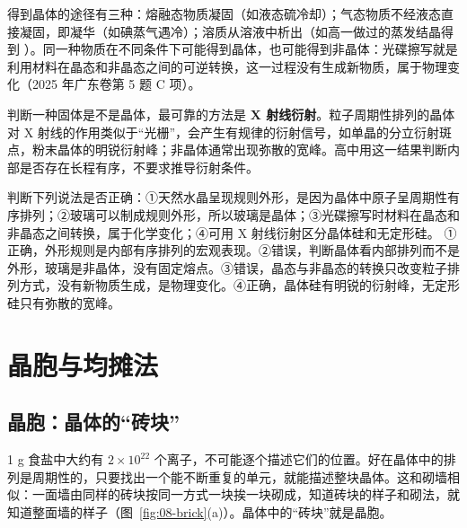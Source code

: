 得到晶体的途径有三种：熔融态物质凝固（如液态硫冷却）；气态物质不经液态直接凝固，即凝华（如碘蒸气遇冷）；溶质从溶液中析出（如高一做过的蒸发结晶得到 ）。同一种物质在不同条件下可能得到晶体，也可能得到非晶体：光碟擦写就是利用材料在晶态和非晶态之间的可逆转换，这一过程没有生成新物质，属于物理变化（2025 年广东卷第 5 题 C 项）。

判断一种固体是不是晶体，最可靠的方法是 \textbf{X 射线衍射}。粒子周期性排列的晶体对 X 射线的作用类似于“光栅”，会产生有规律的衍射信号，如单晶的分立衍射斑点，粉末晶体的明锐衍射峰；非晶体通常出现弥散的宽峰。高中用这一结果判断内部是否存在长程有序，不要求推导衍射条件。

\begin{liti}[晶态与非晶态的基础判断]
判断下列说法是否正确：①天然水晶呈现规则外形，是因为晶体中原子呈周期性有序排列；②玻璃可以制成规则外形，所以玻璃是晶体；③光碟擦写时材料在晶态和非晶态之间转换，属于化学变化；④可用 X 射线衍射区分晶体硅和无定形硅。
\tcblower
\jie ①正确，外形规则是内部有序排列的宏观表现。②错误，判断晶体看内部排列而不是外形，玻璃是非晶体，没有固定熔点。③错误，晶态与非晶态的转换只改变粒子排列方式，没有新物质生成，是物理变化。④正确，晶体硅有明锐的衍射峰，无定形硅只有弥散的宽峰。
\end{liti}

\section{晶胞与均摊法}

\subsection{晶胞：晶体的“砖块”}

1 g 食盐中大约有 $2\times10^{22}$ 个离子，不可能逐个描述它们的位置。好在晶体中的排列是周期性的，只要找出一个能不断重复的单元，就能描述整块晶体。这和砌墙相似：一面墙由同样的砖块按同一方式一块挨一块砌成，知道砖块的样子和砌法，就知道整面墙的样子（图~\ref{fig:08-brick}(a)）。晶体中的“砖块”就是晶胞。

